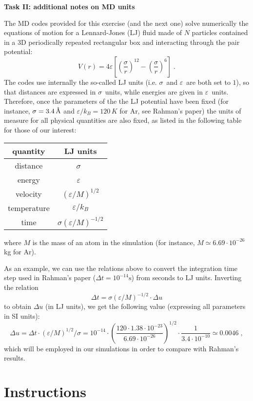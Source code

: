 \documentclass[12pt]{article}
\newcommand{\ee}{\ensuremath{\varepsilon}}
\newcommand{\sg}{\ensuremath{\sigma}}
\newcommand{\ang}{\ensuremath{\textnormal{\AA}}}
\newcommand{\secs}{\ensuremath{\textrm{s}}}
\begin{document}
\clearpage
\begin{center}
\bf Task II: additional notes on MD units 
\end{center}

The MD codes provided for this exercise (and the next one) solve numerically the
equations of motion for a Lennard-Jones (LJ) fluid made of $N$ particles
contained in a 3D periodically repeated rectangular box and interacting through
the pair potential:
\[
V(r) = 4\ee \left[ \left(\frac{\sg}{r}\right)^{12}
 -\left(\frac{\sg}{r}\right)^6\right] \;.
\]
The codes use internally the so-called LJ units (i.e. \sg\ and \ee\ are both set
to $1$), so that distances are expressed in \sg\ units, while energies are given
in \ee\ units.  Therefore, once the parameters of the the LJ potential have been
fixed (for instance, $\sg=3.4\,\ang$ and $\ee/k_B = 120\,K$ for Ar, see Rahman's
paper) the units of measure for all physical quantities are also fixed, as
listed in the following table for those of our interest:
\begin{center}
 \begin{tabular}{c|c}
quantity & LJ units \\
\hline
distance & \sg\ \\
energy  & \ee\ \\
velocity & $(\ee/M)^{1/2}$ \\
temperature & $\ee/k_B$ \\
time & $\sg (\ee/M)^{-1/2}$ \\
 \end{tabular}
\end{center}
where $M$ is the mass of an atom in the simulation (for instance, $M \simeq 6.69
\cdot 10^{-26}$ kg for Ar). 

As an example, we can use the relations above to convert the integration time
step used in Rahman's paper ($\Delta t = 10^{-14} \secs$) from seconds to LJ
units. Inverting the relation 
\[
\Delta t = \sg (\ee/M)^{-1/2} \cdot \Delta u
\]
to obtain $\Delta u$ (in LJ units), we get the following value (expressing all
parameters in SI units):
\[
\Delta u =  \Delta t \cdot (\ee/M)^{1/2}/\sg = 10^{-14} \cdot \left(\frac{120
\cdot 1.38 \cdot 10^{-23}}{6.69 \cdot 10^{-26}}\right)^{1/2} \cdot \frac{1}{3.4
\cdot 10^{-10}} \simeq 0.0046\;,
\]
which will be employed in our simulations in order to compare with Rahman's results.

\newpage
\section*{Instructions}
\end{document}
